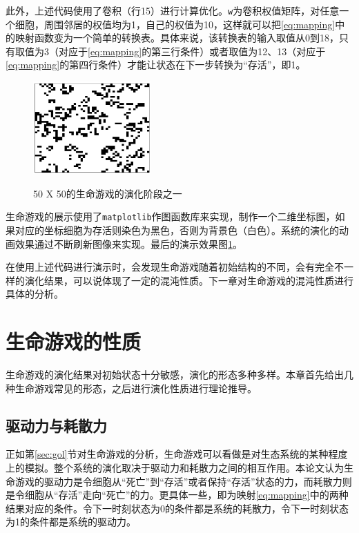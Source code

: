\documentclass[a4paper,12pt]{report}
\begin{document}
此外，上述代码使用了卷积（行15）进行计算优化。\texttt{w}为卷积权值矩阵，对任意一个细胞，周围邻居的权值均为1，自己的权值为10，这样就可以把\ref{eq:mapping}中的映射函数变为一个简单的转换表。具体来说，该转换表的输入取值从0到18，只有取值为3（对应于\ref{eq:mapping}的第三行条件）或者取值为12、13（对应于\ref{eq:mapping}的第四行条件）才能让状态在下一步转换为“存活”，即1。

\begin{figure}[!ht]
	\centering
	\includegraphics[width=0.4\textwidth]{images/gol.png}
	\label{fig:gol}
	\caption{50 X 50的生命游戏的演化阶段之一}
\end{figure}

生命游戏的展示使用了\texttt{matplotlib}作图函数库来实现，制作一个二维坐标图，如果对应的坐标细胞为存活则染色为黑色，否则为背景色（白色）。系统的演化的动画效果通过不断刷新图像来实现。最后的演示效果图\ref{fig:gol}。

在使用上述代码进行演示时，会发现生命游戏随着初始结构的不同，会有完全不一样的演化结果，可以说体现了一定的混沌性质。下一章对生命游戏的混沌性质进行具体的分析。

\chapter{生命游戏的性质}

生命游戏的演化结果对初始状态十分敏感，演化的形态多种多样。本章首先给出几种生命游戏常见的形态，之后进行演化性质进行理论推导。

\section{驱动力与耗散力}

正如第\ref{sec:gol}节对生命游戏的分析，生命游戏可以看做是对生态系统的某种程度上的模拟。整个系统的演化取决于驱动力和耗散力之间的相互作用。本论文认为生命游戏的驱动力是令细胞从“死亡”到“存活”或者保持“存活”状态的力，而耗散力则是令细胞从“存活”走向“死亡”的力。更具体一些，即为映射\ref{eq:mapping}中的两种结果对应的条件。令下一时刻状态为0的条件都是系统的耗散力，令下一时刻状态为1的条件都是系统的驱动力。
\end{document}

